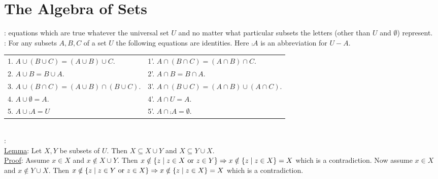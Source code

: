 \documentclass[12pt]{book}
\begin{document}
\section{The Algebra of Sets}
: equations which are true whatever the universal set $U$ and no matter what particular subsets the letters (other than $U$ and $\emptyset$) represent.\\ \linebreak
{}: For any subsets $A, B, C$ of a set $U$ the following equations are identities. Here $\comp{A}$ is an abbreviation for $U - A$.\\
\begin{tabular}{ll}
1. $A \cup (B \cup C) = (A \cup B) \cup C$.& 1'. $A \cap (B \cap C) = (A \cap B) \cap C$.\\
2. $A \cup B = B \cup A$.& 2'. $A \cap B = B \cap A$.\\
3. $A \cup (B \cap C) = (A \cup B) \cap (B \cup C)$.& 3'. $A \cap (B \cup C) = (A \cap B) \cup (A \cap C)$.\\
4. $A \cup \emptyset = A$.& 4'. $A \cap U = A$.\\
5. $A \cup \comp{A} = U$& 5'. $A \cap \comp{A} = \emptyset$.
\end{tabular}\\ \linebreak
{}:\\
\small \underline{Lemma}: Let $X,Y$ be subsets of $U$. Then $X \subseteq X \cup Y$ and $X \subseteq Y \cup X$.\\ \underline{Proof}: Assume $x \in X$ and $x \notin X \cup Y$. Then $x \notin \{z \mid z \in X \text{ or } z \in Y\} \Rightarrow x \notin \{z \mid z \in X\} = X$ which is a contradiction. Now assume $x \in X$ and $x \notin Y \cup X$. Then $x \notin \{z \mid z \in Y \text{ or } z \in X\} \Rightarrow x \notin \{z \mid z \in X\} = X$ which is a contradiction. \normalsize
\renewcommand{\labelenumi}{\arabic{enumi}.}
\end{document}
